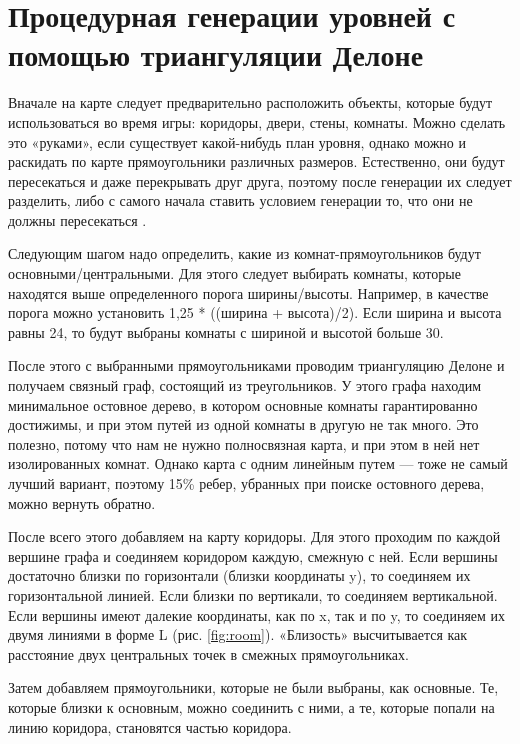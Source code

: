 \documentclass[a4paper,12pt]{report}
\begin{document}
\section{Процедурная генерации уровней с помощью триангуляции Делоне}

Вначале на карте следует предварительно расположить объекты, которые будут использоваться во время игры: коридоры, двери, стены, комнаты. Можно сделать это «руками», если существует какой-нибудь план уровня, однако можно и раскидать по карте прямоугольники различных размеров. Естественно, они будут пересекаться и даже перекрывать друг друга, поэтому после генерации их следует разделить, либо с самого начала ставить условием генерации то, что они не должны пересекаться \citep{room}.

Следующим шагом надо определить, какие из комнат-прямоугольников будут основными/центральными. Для этого следует выбирать комнаты, которые находятся выше определенного порога ширины/высоты. Например, в качестве порога можно установить 1,25 * ((ширина + высота)/2). Если ширина и высота равны 24, то будут выбраны комнаты с шириной и высотой больше 30.

После этого с выбранными прямоугольниками проводим триангуляцию Делоне и получаем связный граф, состоящий из треугольников. У этого графа находим минимальное остовное дерево, в котором основные комнаты гарантированно достижимы, и при этом путей из одной комнаты в другую не так много. Это полезно, потому что нам не нужно полносвязная карта, и при этом в ней нет изолированных комнат. Однако карта с одним линейным путем — тоже не самый лучший вариант, поэтому 15\% ребер, убранных при поиске остовного дерева, можно вернуть обратно.

После  всего этого добавляем на карту коридоры. Для этого проходим по каждой вершине графа и соединяем коридором каждую, смежную с ней. Если вершины достаточно близки по горизонтали (близки координаты y), то соединяем их горизонтальной линией. Если близки по вертикали, то соединяем вертикальной. Если вершины имеют далекие координаты, как по x, так и по y, то соединяем их двумя линиями в форме L (рис. \ref{fig:room}). «Близость» высчитывается как расстояние двух центральных точек в смежных прямоугольниках.

Затем добавляем прямоугольники, которые не были выбраны, как основные. Те, которые близки к основным, можно соединить с ними, а те, которые попали на линию коридора, становятся частью коридора.
\end{document}
